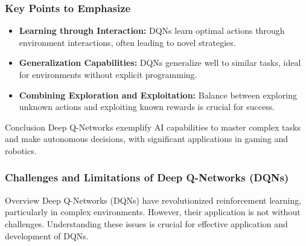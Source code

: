 \documentclass[aspectratio=169]{beamer}
\begin{document}
\begin{frame}[fragile]
    \frametitle{Key Points to Emphasize}
    \begin{itemize}
        \item \textbf{Learning through Interaction:} DQNs learn optimal actions through environment interactions, often leading to novel strategies.
        \item \textbf{Generalization Capabilities:} DQNs generalize well to similar tasks, ideal for environments without explicit programming.
        \item \textbf{Combining Exploration and Exploitation:} Balance between exploring unknown actions and exploiting known rewards is crucial for success.
    \end{itemize}

    \begin{block}{Conclusion}
        Deep Q-Networks exemplify AI capabilities to master complex tasks and make autonomous decisions, with significant applications in gaming and robotics.
    \end{block}
\end{frame}

\begin{frame}[fragile]
    \frametitle{Challenges and Limitations of Deep Q-Networks (DQNs)}
    
    \begin{block}{Overview}
        Deep Q-Networks (DQNs) have revolutionized reinforcement learning, particularly in complex environments. However, their application is not without challenges. Understanding these issues is crucial for effective application and development of DQNs.
    \end{block}
\end{frame}
\end{document}
